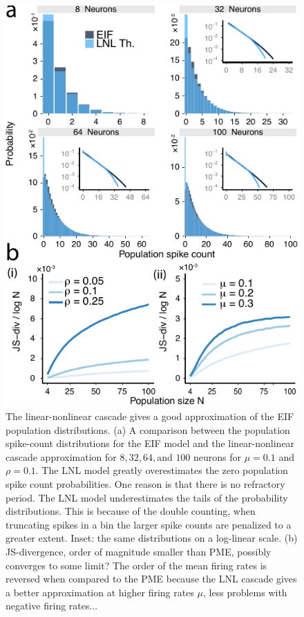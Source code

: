 \documentclass[%
 reprint,
 twocolumn,
 amsmath,amssymb,
 aps,
floatfix,
]{revtex4}
\begin{document}
\begin{figure}[h]
\includegraphics{figures/fig_4a}
\caption{\label{fig:eiffilter} The linear-nonlinear cascade gives a good approximation of the EIF population distributions. (a) A comparison between the population spike-count distributions for the EIF model and the linear-nonlinear cascade approximation for $8, 32, 64, \text{and } 100$ neurons for $\mu = 0.1$ and $\rho = 0.1$. The LNL model greatly overestimates the zero population spike count probabilities. One reason is that there is no refractory period. The LNL model underestimates the tails of the probability distributions. This is because of the double counting, when truncating spikes in a bin the larger spike counts are penalized to a greater extent. Inset: the same distributions on a log-linear scale. (b) JS-divergence, order of magnitude smaller than PME, possibly converges to some limit? The order of the mean firing rates is reversed when compared to the PME because the LNL cascade gives a better approximation at higher firing rates $\mu$, less problems with negative firing rates...}
\end{figure}
\end{document}

